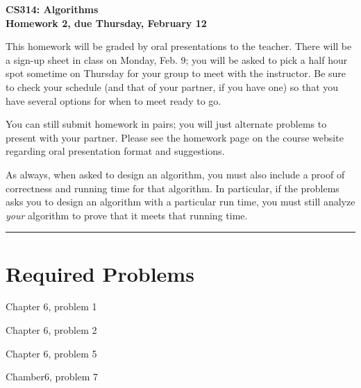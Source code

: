 \documentclass[11pt]{article}
\begin{document}


\begin{center}
{\LARGE\bf      CS314: Algorithms}
\\[1ex]
{\Large\bf      Homework 2, due Thursday, February 12}
\\[0.25in]
\end{center}

This homework will be graded by oral presentations to the teacher.
There will be a sign-up sheet in class on Monday, Feb. 9; you will
be asked to pick a half hour spot sometime on Thursday for your
group to meet with the instructor.  Be sure to check your schedule
(and that of your partner, if you have one) so that you have several
options for when to meet ready to go.

You can still submit homework in pairs; you will just alternate
problems to present with your partner.  Please see the homework page
on the course website regarding oral presentation format and
suggestions.

As always, when asked to design an algorithm, you must also include
a proof of correctness and running time for that algorithm. In
particular, if the problems asks you to design an algorithm with a
particular run time, you must still analyze {\em your} algorithm to
prove that it meets that running time.

\medskip
\bigskip\hrule\bigskip

\section*{Required Problems}

\begin{problems}
\item Chapter 6, problem 1

\item Chapter 6, problem 2

\item Chapter 6, problem 5

\item Chamber6, problem 7

\end{problems}
\end{document}
